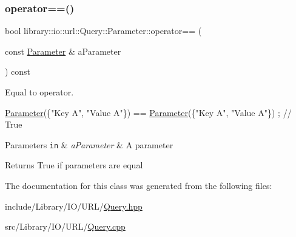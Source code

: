 \subsubsection{\texorpdfstring{operator==()}{operator==()}}
{\footnotesize\ttfamily bool library\+::io\+::url\+::\+Query\+::\+Parameter\+::operator== (\begin{DoxyParamCaption}\item[{const \hyperlink{classlibrary_1_1io_1_1url_1_1_query_1_1_parameter}{Parameter} \&}]{a\+Parameter }\end{DoxyParamCaption}) const}



Equal to operator. 


\begin{DoxyCode}
\hyperlink{classlibrary_1_1io_1_1url_1_1_query_1_1_parameter_ad6160646a07cb92213403426dbba4c64}{Parameter}(\{\textcolor{stringliteral}{"Key A"}, \textcolor{stringliteral}{"Value A"}\}) == \hyperlink{classlibrary_1_1io_1_1url_1_1_query_1_1_parameter_ad6160646a07cb92213403426dbba4c64}{Parameter}(\{\textcolor{stringliteral}{"Key A"}, \textcolor{stringliteral}{"Value A"}\}) ; \textcolor{comment}{// True}
\end{DoxyCode}



\begin{DoxyParams}[1]{Parameters}
\mbox{\tt in}  & {\em a\+Parameter} & A parameter \\
\hline
\end{DoxyParams}
\begin{DoxyReturn}{Returns}
True if parameters are equal 
\end{DoxyReturn}


The documentation for this class was generated from the following files\+:\begin{DoxyCompactItemize}
\item 
include/\+Library/\+I\+O/\+U\+R\+L/\hyperlink{_query_8hpp}{Query.\+hpp}\item 
src/\+Library/\+I\+O/\+U\+R\+L/\hyperlink{_query_8cpp}{Query.\+cpp}\end{DoxyCompactItemize}
